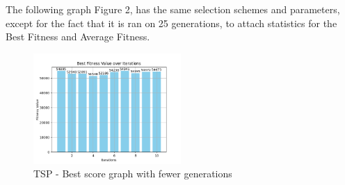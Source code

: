 \documentclass[12pt]{article}
\begin{document}
The following graph Figure 2, has the same selection schemes and parameters, except for the fact that it is ran on 25 generations, to attach statistics for the Best Fitness and Average Fitness.

\begin{figure}[h]
    \centering
    \includegraphics[width=0.5\textwidth]{images/TSPlessgen.png}
    \caption{TSP - Best score graph with fewer generations}
\end{figure}
\end{document}
